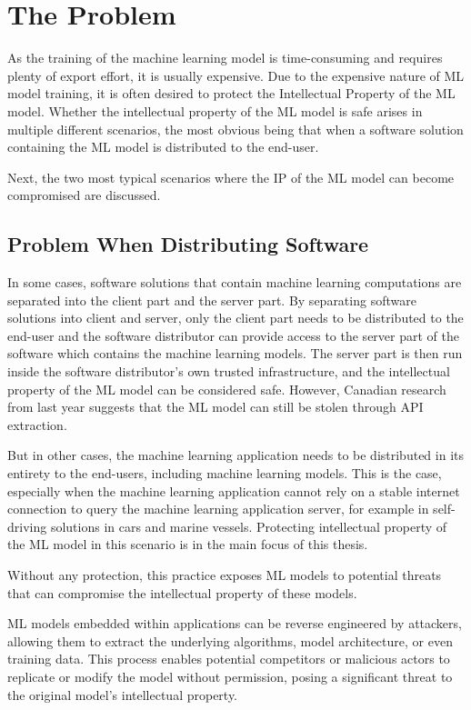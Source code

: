 \chapter{The Problem} \label{problem}

As the training of the machine learning model is time-consuming and requires plenty of export effort, it is usually expensive. Due to the expensive nature of ML model training, it is often desired to protect the Intellectual Property of the ML model. Whether the intellectual property of the ML model is safe arises in multiple different scenarios, the most obvious being that when a software solution containing the ML model is distributed to the end-user.

Next, the two most typical scenarios where the IP of the ML model can become compromised are discussed.

\section{Problem When Distributing Software} \label{problem-dist}

In some cases, software solutions that contain machine learning computations are separated into the client part and the server part. By separating software solutions into client and server, only the client part needs to be distributed to the end-user and the software distributor can provide access to the server part of the software which contains the machine learning models. The server part is then run inside the software distributor's own trusted infrastructure, and the intellectual property of the ML model can be considered safe. However, Canadian research from last year suggests that the ML model can still be stolen through API extraction\cite{difficulty}.

But in other cases, the machine learning application needs to be distributed in its entirety to the end-users, including machine learning models. This is the case, especially when the machine learning application cannot rely on a stable internet connection to query the machine learning application server, for example in self-driving solutions in cars and marine vessels. Protecting intellectual property of the ML model in this scenario is in the main focus of this thesis.

Without any protection, this practice exposes ML models to potential threats that can compromise the intellectual property of these models. 

ML models embedded within applications can be reverse engineered by attackers, allowing them to extract the underlying algorithms, model architecture, or even training data. This process enables potential competitors or malicious actors to replicate or modify the model without permission, posing a significant threat to the original model's intellectual property.

